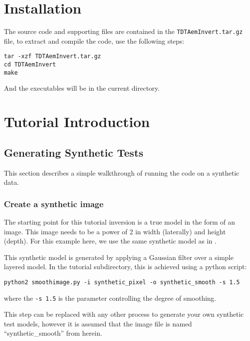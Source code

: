 \documentclass[a4paper,12pt]{article}
\begin{document}
\section{Installation}

The source code and supporting files are contained in the {\tt TDTAemInvert.tar.gz}
file, to extract and compile the code, use the following steps:

\begin{verbatim}
tar -xzf TDTAemInvert.tar.gz
cd TDTAemInvert
make
\end{verbatim}

And the executables will be in the current directory.

\section{Tutorial Introduction}

\subsection{Generating Synthetic Tests}

This section describes a simple walkthrough of running the code on
a synthetic data. 

\subsubsection{Create a synthetic image}

The starting point for this tutorial inversion is a true
model in the form of an image. This image needs to be a power
of 2 in width (laterally) and height (depth). For this example
here, we use the same synthetic model as in \citet{Hawkins:2017:A}.

This synthetic model is generated by applying a Gaussian filter
over a simple layered model. In the tutorial subdirectory, this
is achieved using a python script:

\begin{verbatim}
python2 smoothimage.py -i synthetic_pixel -o synthetic_smooth -s 1.5
\end{verbatim}

where the {\tt -s 1.5} is the parameter controlling the degree of
smoothing.

This step can be replaced with any other process to generate
your own synthetic test models, however it is assumed that
the image file is named ``synthetic\_smooth'' from herein.
\end{document}
